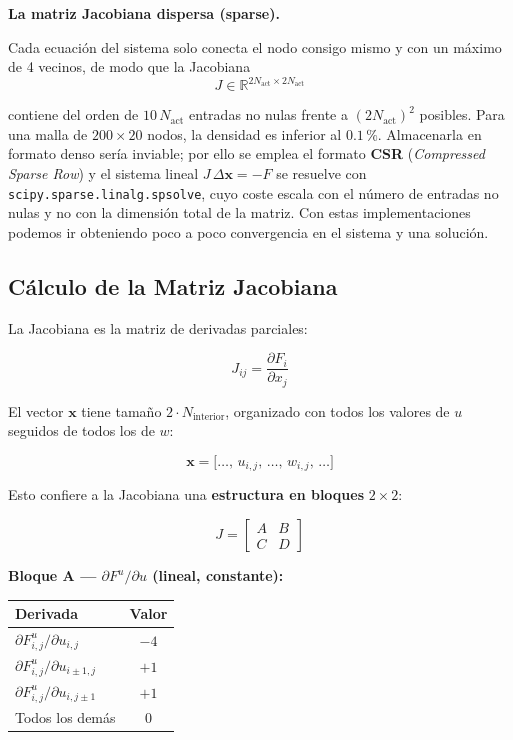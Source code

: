 \documentclass[12pt, a4paper]{article}
\begin{document}
\medskip
\noindent\textbf{La matriz Jacobiana dispersa (sparse).}

Cada ecuación del sistema solo conecta el nodo consigo mismo y con un máximo de 4 vecinos, de modo que la Jacobiana
\[
J \in \mathbb{R}^{2N_{\text{act}} \times 2N_{\text{act}}}
\]

contiene del orden de \(10\,N_{\text{act}}\) entradas no nulas frente a \((2N_{\text{act}})^{2}\) posibles. Para una malla de \(200 \times 20\) nodos, la densidad es inferior al \(0.1\,\text{\%}\). Almacenarla en formato denso sería inviable; por ello se emplea el formato \textbf{CSR} (\emph{Compressed Sparse Row}) y el sistema lineal \(J\,\Delta\mathbf{x} = -F\) se resuelve con \texttt{scipy.sparse.linalg.spsolve}, cuyo coste escala con el número de entradas no nulas y no con la dimensión total de la matriz. Con estas implementaciones podemos ir obteniendo poco a poco convergencia en el sistema y una solución. 


\subsection{Cálculo de la Matriz Jacobiana}
\label{ssec:jacobiana}

La Jacobiana es la matriz de derivadas parciales:

\begin{equation}
  J_{ij} = \frac{\partial F_{i}}{\partial x_{j}}
\end{equation}

El vector $\mathbf{x}$ tiene tamaño $2\cdot N_{\text{interior}}$, organizado
con todos los valores de $u$ seguidos de todos los de $w$:

\begin{equation}
  \mathbf{x} = \bigl[\ldots,\, u_{i,j},\, \ldots,\, w_{i,j},\, \ldots\bigr]
\end{equation}

Esto confiere a la Jacobiana una \textbf{estructura en bloques} $2 \times 2$:

\begin{equation}
  J = \begin{bmatrix} A & B \\ C & D \end{bmatrix}
\end{equation}

\bigskip
\noindent\textbf{Bloque A — $\partial F^{u}/\partial u$ (lineal, constante):}

\begin{center}
\begin{tabular}{lc}
  \toprule
  \textbf{Derivada} & \textbf{Valor} \\
  \midrule
  $\partial F^{u}_{i,j}/\partial u_{i,j}$        & $-4$ \\
  $\partial F^{u}_{i,j}/\partial u_{i\pm1,j}$    & $+1$ \\
  $\partial F^{u}_{i,j}/\partial u_{i,j\pm1}$    & $+1$ \\
  Todos los demás                                 & $0$  \\
  \bottomrule
\end{tabular}
\end{center}
\end{document}
